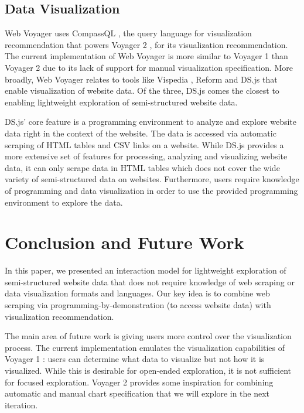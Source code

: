 \documentclass{vgtc}                          %
\begin{document}
\subsection{Data Visualization}

Web Voyager uses CompassQL \cite{wongsuphasawat2016}, the query
language for visualization recommendation that powers Voyager 2
\cite{wongsuphasawat2017}, for its visualization recommendation. The
current implementation of Web Voyager is more similar to Voyager 1 \cite{wongsuphasawat2016a} than
Voyager 2 due to its lack of support for manual visualization
specification. More broadly, Web Voyager relates to tools like Vispedia
\cite{chan2008}, Reform \cite{toomim2009} and DS.js \cite{zhang2017}
that enable visualization of website data. Of the three, DS.js comes the
closest to enabling lightweight exploration of semi-structured website
data.

DS.js' core feature is a programming environment to analyze and explore
website data right in the context of the website. The data is accessed
via automatic scraping of HTML tables and CSV links on a website. While
DS.js provides a more extensive set of features for processing, analyzing and
visualizing website data, it can only scrape data in HTML tables which
does not cover the wide variety of semi-structured data on websites.
Furthermore, users require knowledge of programming and data visualization in order to use
the provided programming environment to explore the data.

\section{Conclusion and Future Work} \label{conclusion}

In this paper, we presented an interaction model for lightweight
exploration of semi-structured website data that does not require
knowledge of web scraping or data visualization formats and languages.
Our key idea is to combine web scraping via programming-by-demonstration (to access
website data) with visualization recommendation.

The main area of future work is giving users more control over the
visualization process. The current implementation emulates the
visualization capabilities of Voyager 1 \cite{wongsuphasawat2016a}:
users can determine what data to visualize but not how it is visualized.
While this is desirable for open-ended exploration, it is not sufficient
for focused exploration. Voyager 2 \cite{wongsuphasawat2017} provides
some inspiration for combining automatic and manual chart specification
that we will explore in the next iteration.

%

%
%
%


\end{document}
